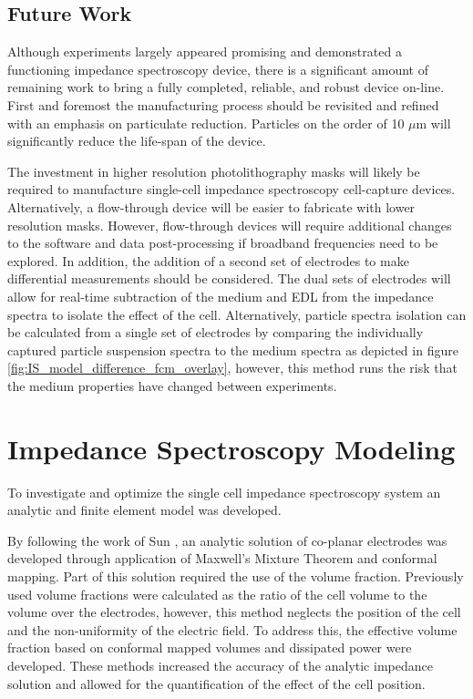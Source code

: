 \subsection*{Future Work}

\par Although experiments largely appeared promising and demonstrated a functioning impedance spectroscopy device, there is a significant amount of remaining work to bring a fully completed, reliable, and robust device on-line. First and foremost the manufacturing process should be revisited and refined with an emphasis on particulate reduction. Particles on the order of 10 $\mu$m will significantly reduce the life-span of the device. 

\par The investment in higher resolution photolithography masks will likely be required to manufacture single-cell impedance spectroscopy cell-capture devices. Alternatively, a flow-through device will be easier to fabricate with lower resolution masks. However, flow-through devices will require additional changes to the software and data post-processing if broadband frequencies need to be explored. In addition, the addition of a second set of electrodes to make differential measurements should be considered. The dual sets of electrodes will allow for real-time subtraction of the medium and EDL from the impedance spectra to isolate the effect of the cell. Alternatively, particle spectra isolation can be calculated from a single set of electrodes by comparing the individually captured particle suspension spectra to the medium spectra as depicted in figure \ref{fig:IS_model_difference_fcm_overlay}, however, this method runs the risk that the medium properties have changed between experiments.

\section{Impedance Spectroscopy Modeling}

\par To investigate and optimize the single cell impedance spectroscopy system an analytic and finite element model was developed. 

\par By following the work of Sun \cite{sun_analytical_2007}, an analytic solution of co-planar electrodes was developed through application of Maxwell's Mixture Theorem and conformal mapping. Part of this solution required the use of the volume fraction. Previously used volume fractions were calculated as the ratio of the cell volume to the volume over the electrodes, however, this method neglects the position of the cell and the non-uniformity of the electric field. To address this, the effective volume fraction based on conformal mapped volumes and dissipated power were developed. These methods increased the accuracy of the analytic impedance solution and allowed for the quantification of the effect of the cell position.

